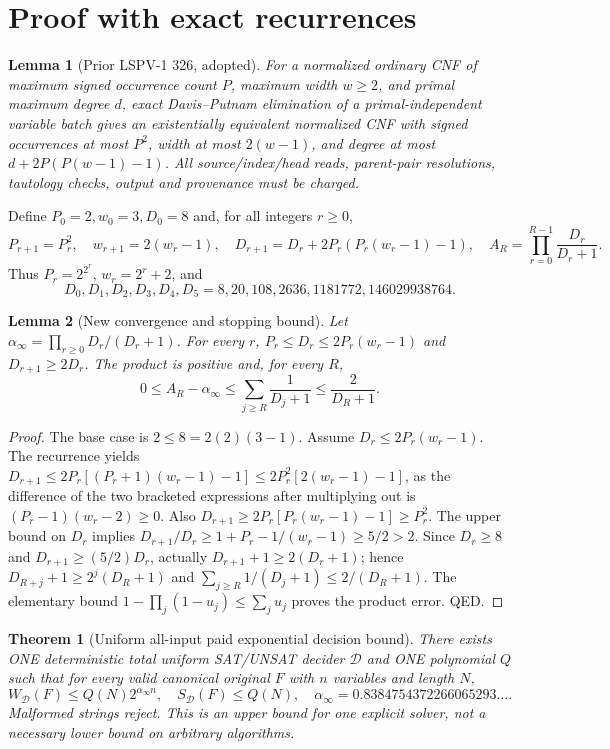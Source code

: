 \documentclass[11pt]{article}
\newtheorem{theorem}{Theorem}
\newtheorem{lemma}{Lemma}
\begin{document}
\section{Proof with exact recurrences}
\begin{lemma}[Prior LSPV-1 326, adopted]
For a normalized ordinary CNF of maximum signed occurrence count $P$, maximum width $w\ge2$, and primal maximum degree $d$, exact Davis--Putnam elimination of a primal-independent variable batch gives an existentially equivalent normalized CNF with signed occurrences at most $P^2$, width at most $2(w-1)$, and degree at most $d+2P(P(w-1)-1)$. All source/index/head reads, parent-pair resolutions, tautology checks, output and provenance must be charged.
\end{lemma}
Define $P_0=2,w_0=3,D_0=8$ and, for all integers $r\ge0$,
\[
P_{r+1}=P_r^2,\quad w_{r+1}=2(w_r-1),\quad
D_{r+1}=D_r+2P_r(P_r(w_r-1)-1),\quad
A_R=\prod_{r=0}^{R-1}\frac{D_r}{D_r+1}.
\]
Thus $P_r=2^{2^r}$, $w_r=2^r+2$, and
\[
D_0,D_1,D_2,D_3,D_4,D_5=
8,20,108,2636,1181772,146029938764.
\]
\begin{lemma}[New convergence and stopping bound]
Let $\alpha_\infty=\prod_{r\ge0}D_r/(D_r+1)$. For every $r$, $P_r\le D_r\le2P_r(w_r-1)$ and $D_{r+1}\ge2D_r$. The product is positive and, for every $R$,
\[
0\le A_R-\alpha_\infty\le\sum_{j\ge R}\frac1{D_j+1}
\le\frac2{D_R+1}.
\]
\end{lemma}
\begin{proof}
The base case is $2\le8=2(2)(3-1)$. Assume $D_r\le2P_r(w_r-1)$. The recurrence yields
$D_{r+1}\le2P_r[(P_r+1)(w_r-1)-1]\le2P_r^2[2(w_r-1)-1]$,
as the difference of the two bracketed expressions after multiplying out is $(P_r-1)(w_r-2)\ge0$. Also
$D_{r+1}\ge2P_r[P_r(w_r-1)-1]\ge P_r^2$.
The upper bound on $D_r$ implies
$D_{r+1}/D_r\ge1+P_r-1/(w_r-1)\ge5/2>2$.
Since $D_r\ge8$ and $D_{r+1}\ge(5/2)D_r$, actually $D_{r+1}+1\ge2(D_r+1)$; hence $D_{R+j}+1\ge2^j(D_R+1)$ and $\sum_{j\ge R}1/(D_j+1)\le2/(D_R+1)$. The elementary bound $1-\prod_j(1-u_j)\le\sum_j u_j$ proves the product error. QED.
\end{proof}
\begin{theorem}[Uniform all-input paid exponential decision bound]
There exists ONE deterministic total uniform SAT/UNSAT decider $\mathcal D$ and ONE polynomial $Q$ such that for every valid canonical original $F$ with $n$ variables and length $N$,
\[
W_{\mathcal D}(F)\le Q(N)2^{\alpha_\infty n},\quad
S_{\mathcal D}(F)\le Q(N),\quad
\boxed{\alpha_\infty=0.8384754372266065293\ldots}.
\]
Malformed strings reject. This is an upper bound for one explicit solver, not a necessary lower bound on arbitrary algorithms.
\end{theorem}
\end{document}
